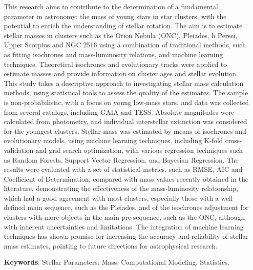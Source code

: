 %
%


\begin{center}
\imprimirtitleenglish
\end{center}

\begin{resumo}[Abstract]
            This research aims to contribute to the determination of a fundamental parameter in astronomy: the mass of young stars in star clusters, with the potential to enrich the understanding of stellar rotation. The aim is to estimate stellar masses in clusters such as the Orion Nebula (ONC), Pleiades, h Persei, Upper Scorpius and NGC 2516 using a combination of traditional methods, such as fitting isochrones and mass-luminosity relations, and machine learning techniques. Theoretical isochrones and evolutionary tracks were applied to estimate masses and provide information on cluster ages and stellar evolution. This study takes a descriptive approach to investigating stellar mass calculation methods, using statistical tools to assess the quality of the estimates. The sample is non-probabilistic, with a focus on young low-mass stars, and data was collected from several catalogs, including GAIA and TESS. Absolute magnitudes were calculated from photometry, and individual interstellar extinction was considered for the youngest clusters. Stellar mass was estimated by means of isochrones and evolutionary models, using machine learning techniques, including K-fold cross-validation and grid search optimization, with various regression techniques such as Random Forests, Support Vector Regression, and Bayesian Regression. The results were evaluated with a set of statistical metrics, such as RMSE, AIC and Coefficient of Determination, compared with mass values recently obtained in the literature, demonstrating the effectiveness of the mass-luminosity relationship, which had a good agreement with most clusters, especially those with a well-defined main sequence, such as the Pleiades, and of the isochrones adjustment for clusters with more objects in the main pre-sequence, such as the ONC, although with inherent uncertainties and limitations. The integration of machine learning techniques has shown promise for increasing the accuracy and reliability of stellar mass estimates, pointing to future directions for astrophysical research.

            \vspace*{12 pt}

            
            \textbf{Keywords}: Stellar Parameters: Mass. Computational Modeling. Statistics.

\end{resumo}

	
